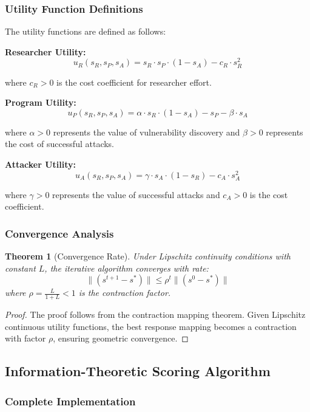 \documentclass[journal]{IEEEtran}
\newtheorem{theorem}{Theorem}
\begin{document}
\subsubsection{Utility Function Definitions}

The utility functions are defined as follows:

\textbf{Researcher Utility:}
$$u_R(s_R, s_P, s_A) = s_R \cdot s_P \cdot (1 - s_A) - c_R \cdot s_R^2$$

where $c_R > 0$ is the cost coefficient for researcher effort.

\textbf{Program Utility:}
$$u_P(s_R, s_P, s_A) = \alpha \cdot s_R \cdot (1 - s_A) - s_P - \beta \cdot s_A$$

where $\alpha > 0$ represents the value of vulnerability discovery and $\beta > 0$ represents the cost of successful attacks.

\textbf{Attacker Utility:}
$$u_A(s_R, s_P, s_A) = \gamma \cdot s_A \cdot (1 - s_R) - c_A \cdot s_A^2$$

where $\gamma > 0$ represents the value of successful attacks and $c_A > 0$ is the cost coefficient.

\subsubsection{Convergence Analysis}

\begin{theorem}[Convergence Rate]
Under Lipschitz continuity conditions with constant $L$, the iterative algorithm converges with rate:
$$\|(s^{t+1} - s^*)\| \leq \rho^t \|(s^0 - s^*)\|$$
where $\rho = \frac{L}{1+L} < 1$ is the contraction factor.
\end{theorem}

\begin{proof}
The proof follows from the contraction mapping theorem. Given Lipschitz continuous utility functions, the best response mapping becomes a contraction with factor $\rho$, ensuring geometric convergence.
\end{proof}

\subsection{Information-Theoretic Scoring Algorithm}

\subsubsection{Complete Implementation}
\end{document}
